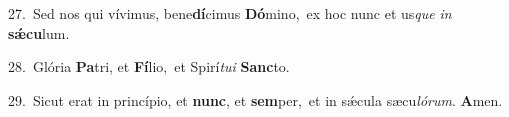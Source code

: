 {\numbfont\textcolor{\numbcolor}{27.}}~Sed nos qui vívimus, bene\-\textbf{dí}\-cimus \textbf{Dó}\-mino,~\star ex hoc nunc et us\textit{que} \textit{in} \textbf{sǽ}\-\textbf{cu}lum.\par
{\numbfont\textcolor{\numbcolor}{28.}}~Glória \textbf{Pa}\-tri, et \textbf{Fí}\-lio,~\star et Spirí\-\textit{tu}\-\textit{i} \textbf{Sanc}\-to.\par
{\numbfont\textcolor{\numbcolor}{29.}}~Sicut erat in princípio, et \textbf{nunc}\-, et \textbf{sem}\-per,~\star et in sǽcula sæcu\-\textit{ló}\-\textit{rum}. \textbf{A}\-men.\par
